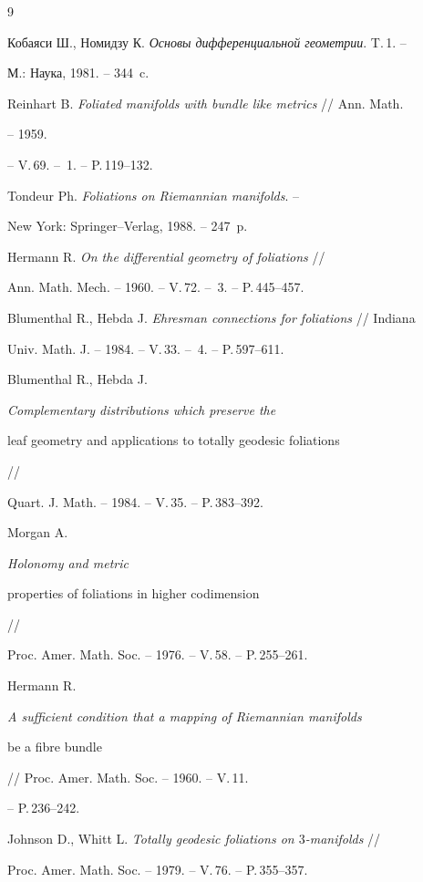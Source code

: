 \begin{thebibliography}{9}







Кобаяси Ш., Номидзу К. {\em Основы дифференциальной геометрии}. T.\,1. -- 


М.: Наука, 1981. -- 344~c.




Reinhart B. {\em Foliated manifolds with bundle like metrics} // Ann. Math. 


-- 1959.


-- V.\,69. -- \No\,1. -- P.\,119--132.




Tondeur Ph. {\em Foliations on Riemannian manifolds}. -- 


New York: Springer--Verlag, 1988. -- 247~p.




Hermann R. {\em On the differential geometry of foliations} //


Ann. Math. Mech. -- 1960. -- V.\,72. -- \No\,3. -- P.\,445--457.




Blumenthal R., Hebda J. {\em Ehresman connections for foliations} // Indiana 


Univ. Math. J. -- 1984. -- V.\,33. -- \No\,4. -- P.\,597--611.




Blumenthal R., Hebda J. {\em Complementary distributions which preserve the


leaf geometry and applications to totally geodesic foliations} //


Quart. J. Math. -- 1984. -- V.\,35. -- P.\,383--392.




Morgan A. {\em Holonomy and metric 


properties of foliations in higher codimension} //


Proc. Amer. Math. Soc. -- 1976. -- V.\,58. -- P.\,255--261.




Hermann R. {\em A sufficient condition that a mapping of Riemannian manifolds


be a fibre bundle} // Proc. Amer. Math. Soc. -- 1960. -- V.\,11.


-- P.\,236--242.




Johnson D., Whitt L. {\em Totally geodesic foliations on $3$-manifolds} //


Proc. Amer. Math. Soc. -- 1979. -- V.\,76. -- P.\,355--357.





\end{thebibliography}






